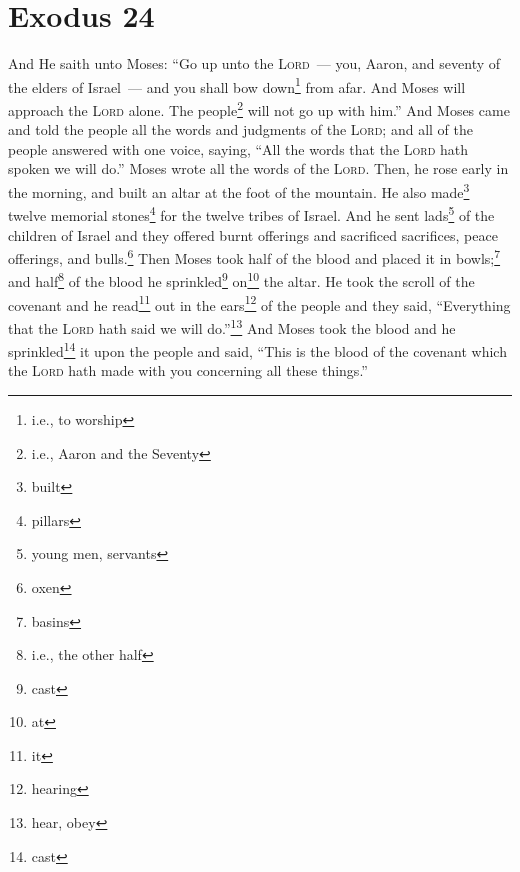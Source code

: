 \section{Exodus 24}\label{Exodus 24}
\begin{enumerate}
     And He saith unto Moses: ``Go up unto the \textsc{Lord}~--- you, Aaron, and seventy of the elders of Israel~--- and you shall bow down\footnote{i.e., to worship} from afar.%
     And Moses will approach the \textsc{Lord} alone. The people\footnote{i.e., Aaron and the Seventy} will not go up with him.''%
     And Moses came and told the people all the words and judgments of the \textsc{Lord}; and all of the people answered with one voice, saying, ``All the words that the \textsc{Lord} hath spoken we will do.''%
     Moses wrote all the words of the \textsc{Lord}. Then, he rose early in the morning, and built an altar at the foot of the mountain. He also made\footnote{built} twelve memorial stones\footnote{pillars} for the twelve tribes of Israel.%
     And he sent lads\footnote{young men, servants} of the children of Israel and they offered burnt offerings and sacrificed sacrifices, peace offerings, and bulls.\footnote{oxen}%
     Then Moses took half of the blood and placed it in bowls;\footnote{basins} and half\footnote{i.e., the other half} of the blood he sprinkled\footnote{cast} on\footnote{at} the altar.%
     He took the scroll of the covenant and he read\footnote{it} out in the ears\footnote{hearing} of the people and they said, ``Everything that the \textsc{Lord} hath said we will do.''\footnote{hear, obey}%
     And Moses took the blood and he sprinkled\footnote{cast} it upon the people and said, ``This is the blood of the covenant which the \textsc{Lord} hath made with you concerning all these things.''%
\end{enumerate}

